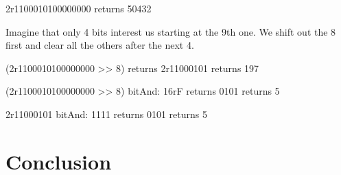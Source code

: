 \documentclass[a4paper,10pt,twoside]{book}
\begin{document}
\begin{code}{}
2r1100010100000000 
	returns 50432
\end{code}

Imagine that only 4 bits interest us starting at the 9th one.
We shift out the 8 first and clear all the others after the next 4.  

\begin{code}{}
(2r1100010100000000 >> 8)
	returns 2r11000101
	returns 197

(2r1100010100000000 >> 8) bitAnd: 16rF	
	returns 0101	
	returns 5
	
2r11000101 bitAnd: 1111
	returns 0101	
	returns 5
\end{code}






\section{Conclusion}

\ifx\wholebook\relax\else
   
   
\end{document}
